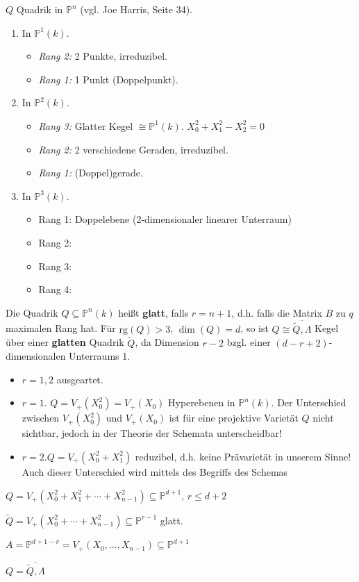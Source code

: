 \begin{example}
  $Q$ Quadrik in $\mathbb{P}^{n}$ (vgl. Joe Harris, Seite 34).
  \begin{enumerate}
  \item In $\mathbb{P}^{1}(k)$. 
    \begin{itemize}
    \item \emph{Rang 2:} 2 Punkte, irreduzibel. 
    \item \emph{Rang 1:} 1 Punkt (Doppelpunkt). 
    \end{itemize}
  \item In $\mathbb{P}^{2}(k)$.
    \begin{itemize}
    \item \emph{Rang 3:} Glatter Kegel
      $\cong\mathbb{P}^{1}(k)$. $X_{0}^{2}+X_{1}^{2}-X_{2}^{2}=0$
    \item \emph{Rang 2:} 2 verschiedene Geraden, irreduzibel. 
    \item \emph{Rang 1:} (Doppel)gerade.
    \end{itemize}
  \item In $\mathbb{P}^{3}(k)$.
    \begin{itemize}
    \item Rang 1: Doppelebene (2-dimensionaler linearer Unterraum)
    \item Rang 2: 
    \item Rang 3:
    \item Rang 4:
    \end{itemize}
  \end{enumerate}
\end{example}
Die Quadrik $Q\subseteq\mathbb{P}^{n}(k)$ heißt \textbf{glatt}, falls
$r=n+1$, d.h. falls die Matrix $B$ zu $q$ maximalen Rang hat. Für
$\text{rg}(Q)>3$, $\dim(Q)=d$, so ist
$Q\cong\overline{\widetilde{Q},\Lambda}$ Kegel über einer
\textbf{glatten }Quadrik $\widetilde{Q}$, da Dimension $r-2$
bzgl. einer $(d-r+2)$-dimensionalen Unterraums 1.
\begin{itemize}
\item $r=1,2$ ausgeartet.
\item $r=1$. $Q=V_{+}(X_{0}^{2})=V_{+}(X_{0})$ Hyperebenen in
  $\mathbb{P}^{n}(k)$.  Der Unterschied zwischen $V_{+}(X_{0}^{2})$
  und $V_{+}(X_{0})$ ist für eine projektive Varietät $Q$ nicht
  sichtbar, jedoch in der Theorie der Schemata unterscheidbar!
\item $r=2$.$Q=V_{+}(X_{0}^{2}+X_{1}^{2})$ reduzibel, d.h. keine
  Prävarietät in unserem Sinne! Auch dieser Unterschied wird mittels
  des Begriffs des Schemas
\end{itemize}
\medskip{}

$Q=V_{+}(X_{0}^{2}+X_{1}^{2}+\cdots+X_{n-1}^{2})\subseteq\mathbb{P}^{d+1}$,
$r\leq d+2$

$\tilde{Q}=V_{+}(X_{0}^{2}+\cdots+X_{n-1}^{2})\subseteq\mathbb{P}^{r-1}$
glatt.

$A=\mathbb{P}^{d+1-v}=V_{+}(X_{0},\ldots,X_{n-1})\subseteq\mathbb{P}^{d+1}$

$Q=\overline{\widetilde{Q},\Lambda}$
